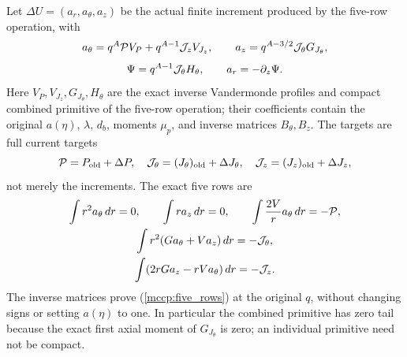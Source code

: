 Let $\Delta U=(a_r,a_\theta,a_z)$ be the actual finite increment produced
by the five-row operation, with
\[
 a_\theta=q^A{\cal P}V_P+q^{A-1}{\cal J}_zV_{J_z},
 \qquad a_z=q^{A-3/2}{\cal J}_\theta G_{J_\theta},
\]
\[
 \Psi=q^{A-1}{\cal J}_\theta H_\theta,
 \qquad a_r=-\partial_z\Psi.
\]
Here $V_P,V_{J_z},G_{J_\theta},H_\theta$ are the exact inverse
Vandermonde profiles and compact combined primitive of the five-row
operation; their coefficients contain the original $a(\eta)$,
$\lambda$, $d_b$, moments $\mu_p$, and inverse matrices $B_\theta,B_z$.
The targets are full current targets
\[
 {\cal P}=P_{\rm old}+\Delta P,\quad
 {\cal J}_\theta=(J_\theta)_{\rm old}+\Delta J_\theta,\quad
 {\cal J}_z=(J_z)_{\rm old}+\Delta J_z,
\]
not merely the increments. The exact five rows are
\begin{equation}\label{mccp:five_rows}
\begin{gathered}
 \int r^2a_\theta\,dr=0,\qquad \int ra_z\,dr=0,\qquad
 \int \frac{2V}{r}a_\theta\,dr=-{\cal P},\\
 \int r^2(Ga_\theta+Va_z)\,dr=-{\cal J}_\theta,\\
 \int(2rGa_z-rVa_\theta)\,dr=-{\cal J}_z.
\end{gathered}
\end{equation}
The inverse matrices prove (\ref{mccp:five_rows}) at the original $q$,
without changing signs or setting $a(\eta)$ to one. In particular the
combined primitive has zero tail because the exact first axial moment of
$G_{J_\theta}$ is zero; an individual primitive need not be compact.

